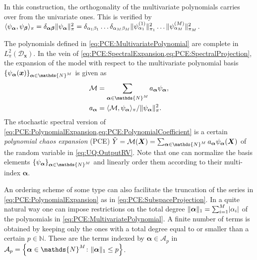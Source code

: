In this construction, the orthogonality of the multivariate polynomials carries over from the univariate ones.
This is verified by
\(\langle \psi_{\bm{\alpha}}, \psi_{\bm{\beta}} \rangle_\pi = \delta_{\bm{\alpha} \bm{\beta}} \lVert \psi_{\bm{\alpha}} \rVert_\pi^2
= \delta_{\alpha_1 \beta_1} \ldots \delta_{\alpha_M \beta_M}
\lVert \psi^{(1)}_{\alpha_1} \rVert_{\pi_1}^2 \ldots \lVert \psi^{(M)}_{\alpha_M} \rVert_{\pi_M}^2\).
\par %
The polynomials defined in \cref{eq:PCE:MultivariatePolynomial} are complete in \(L_{\pi}^2(\mathcal{D}_{\bm{x}})\).
In the vein of \cref{eq:PCE:SpectralExpansion,eq:PCE:SpectralProjection}, the expansion of the model with respect to the multivariate polynomial basis
\(\{\basisU_{\bm{\alpha}}(\bm{x})\}_{\bm{\alpha} \in \mathds{N}^\dimParam}\) is given as
\begin{align}
  \mathcal{M} &= \sum\limits_{\bm{\alpha} \in \mathds{N}^\dimParam} \coeffM_{\bm{\alpha}} \basisU_{\bm{\alpha}}, \label{eq:PCE:PolynomialExpansion} \\
  \coeffM_{\bm{\alpha}} &= \langle \mathcal{M}, \basisU_{\bm{\alpha}} \rangle_\pi / \lVert \basisU_{\bm{\alpha}} \rVert_\pi^2. \label{eq:PCE:PolynomialCoefficient}
\end{align}
The stochastic spectral version of \cref{eq:PCE:PolynomialExpansion,eq:PCE:PolynomialCoefficient} is a certain \emph{polynomial chaos expansion} (PCE)
\(\tilde{Y} = \mathcal{M}(\bm{X}) = \sum_{\bm{\alpha} \in \mathds{N}^\dimParam} \coeffM_{\bm{\alpha}} \basisU_{\bm{\alpha}}(\bm{X})\) of the random variable in \cref{eq:UQ:OutputRV}.
Note that one can normalize the basis elements \(\{\basisU_{\bm{\alpha}}\}_{\bm{\alpha} \in \mathds{N}^\dimParam}\)
and linearly order them according to their multi-index \(\bm{\alpha}\).
\par %
An ordering scheme of some type can also facilitate the truncation of the series in \cref{eq:PCE:PolynomialExpansion} as in \cref{eq:PCE:SubspaceProjection}.
In a quite natural way one can impose restrictions on the total degree
\(\lVert \bm{\alpha} \rVert_1 = \sum_{i=1}^M \lvert \alpha_i \rvert\) of the polynomials in \cref{eq:PCE:MultivariatePolynomial}.
A finite number of terms is obtained by keeping only the ones with a total degree equal to or smaller than a certain \(p \in \mathds{N}\).
These are the terms indexed by \(\bm{\alpha} \in \mathcal{A}_p\) in \(\mathcal{A}_p = \left\{ \bm{\alpha} \in \mathds{N}^\dimParam \colon \lVert \bm{\alpha} \rVert_1 \leq p \right\}\).
